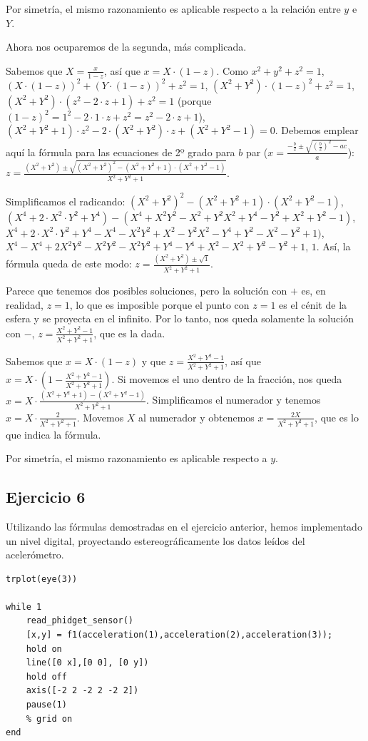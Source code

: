 \documentclass{article}
\newcommand{\sej}[1]{\subsection{Ejercicio #1}}
\begin{document}
Por simetría, el mismo razonamiento es aplicable respecto a la relación entre $y$ e $Y$.

Ahora nos ocuparemos de la segunda, más complicada.

Sabemos que $X=\frac{x}{1-z}$, así que $x=X \cdot (1-z)$. Como $x^2+y^2+z^2=1$, $(X \cdot (1-z))^2+(Y \cdot (1-z))^2+z^2=1$, $(X^2+Y^2) \cdot (1-z)^2 + z^2 = 1$,
$(X^2+Y^2) \cdot (z^2 - 2\cdot z + 1) + z^2 = 1$ (porque $(1-z)^2=1^2-2\cdot 1 \cdot z + z^2 = z^2 - 2\cdot z + 1$), $(X^2+Y^2+1) \cdot z^2 - 2 \cdot (X^2+Y^2) \cdot z + 
(X^2+Y^2-1)= 0$. Debemos emplear aquí la fórmula para las ecuaciones de 2º grado para $b$ par ($x=\frac{-\frac{b}{2}\pm\sqrt{(\frac{b}{2})^2-ac}}{a}$):
$z = \frac{(X^2+Y^2)\pm\sqrt{(X^2+Y^2)^2-(X^2+Y^2+1) \cdot (X^2+Y^2-1)}}{X^2+Y^2+1}$.

Simplificamos el radicando: $(X^2+Y^2)^2-(X^2+Y^2+1) \cdot (X^2+Y^2-1)$,
$(X^4 + 2 \cdot X^2 \cdot Y^2 + Y^4) - (X^4+X^2 Y^2-X^2+Y^2 X^2+Y^4-Y^2+X^2+Y^2-1)$, $X^4 + 2 \cdot X^2 \cdot Y^2 + Y^4 - X^4-X^2 Y^2+X^2-Y^2 X^2-Y^4+Y^2-X^2-Y^2+1)$,
$X^4 - X^4 + 2 X^2 Y^2 - X^2 Y^2 - X^2 Y^2 + Y^4 - Y^4 + X^2 - X^2 + Y^2 - Y^2 + 1$, $1$. Así, la fórmula queda de este modo: $z = \frac{(X^2+Y^2)\pm\sqrt{1}}{X^2+Y^2+1}$.

Parece que tenemos dos posibles soluciones, pero la solución con $+$ es, en realidad, $z=1$, lo que es imposible porque el punto con $z=1$ es el cénit de la esfera y 
se proyecta en el infinito. Por lo tanto, nos queda solamente la solución con $-$, $z = \frac{X^2+Y^2-1}{X^2+Y^2+1}$, que es la dada.

Sabemos que $x=X \cdot (1-z)$ y que $z = \frac{X^2+Y^2-1}{X^2+Y^2+1}$, así que $x = X \cdot \left(1-\frac{X^2+Y^2-1}{X^2+Y^2+1}\right)$.
Si movemos el uno dentro de la fracción, nos queda $x = X \cdot \frac{(X^2+Y^2+1)-(X^2+Y^2-1)}{X^2+Y^2+1}$. Simplificamos el numerador y tenemos 
$x = X \cdot \frac{2}{X^2+Y^2+1}$. Movemos $X$ al numerador y obtenemos $x=\frac{2X}{X^2+Y^2+1}$, que es lo que indica la fórmula.

Por simetría, el mismo razonamiento es aplicable respecto a $y$.

\sej{6}
Utilizando las fórmulas demostradas en el ejercicio anterior, hemos implementado un nivel digital, proyectando estereográficamente los datos leídos del acelerómetro.

\begin{lstlisting}[frame=single]
trplot(eye(3))

while 1
    read_phidget_sensor()
    [x,y] = f1(acceleration(1),acceleration(2),acceleration(3));
    hold on
    line([0 x],[0 0], [0 y])
    hold off
    axis([-2 2 -2 2 -2 2])
    pause(1)
    % grid on
end
\end{lstlisting}
\end{document}
